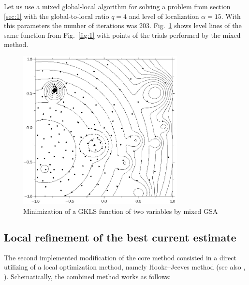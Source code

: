\documentclass{llncs}
\begin{document}
Let us use a mixed global-local algorithm for solving a problem from section \ref{sec:1} with the global-to-local ratio $q=4$ and level of localization $\alpha = 15$. With this parameters the number of iterations was $203$. Fig.~\ref{fig:2} shows level lines of the same function from Fig.~\ref{fig:1} with points of the trials performed by the mixed method.

\begin{figure}
	\center
  \includegraphics[width=0.75\textwidth]{fig3.jpg} 
  \caption{Minimization of a GKLS function of two variables by mixed GSA}
  \label{fig:2}       %
\end{figure} 

\subsection{Local refinement of the best current estimate} \label{hooke}

The second implemented modification of the core method consisted in a direct utilizing of a local optimization method, namely Hooke--Jeeves method \cite{HookeJeeves} (see also \cite{Wilde}, \cite{Himmelblau}). Schematically, the combined method works as follows:
\end{document}
